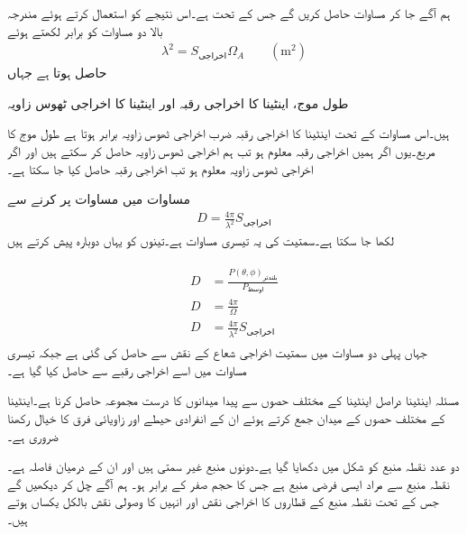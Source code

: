 ہم آگے جا کر مساوات  حاصل کریں گے جس کے تحت   ہے۔اس نتیجے کو استعمال کرتے ہوئے مندرجہ بالا دو مساوات کو برابر لکھتے ہوئے
\begin{align}\label{مساوات_اینٹینا_اخراجی_ٹھوس_زاویہ_اخراجی_رقبہ_تعلق}
\lambda^2 =S_{\text{اخراجی}} \Omega_A \quad \quad (\si{\meter \squared})
\end{align}
حاصل ہوتا ہے جہاں
\begin{description}
 طول موج،
  اینٹینا کا اخراجی رقبہ اور
 اینٹینا کا اخراجی ٹھوس زاویہ
\end{description}
ہیں۔اس مساوات کے تحت اینٹینا کا اخراجی رقبہ ضرب اخراجی ٹھوس زاویہ برابر ہوتا ہے  طول موج کا مربع۔یوں اگر ہمیں اخراجی رقبہ معلوم ہو تب ہم اخراجی ٹھوس زاویہ حاصل کر سکتے ہیں اور اگر اخراجی ٹھوس زاویہ معلوم ہو تب اخراجی رقبہ حاصل کیا جا سکتا ہے۔

مساوات  میں مساوات  پر کرنے سے
\begin{align}
D=\frac{4\pi}{\lambda^2} S_{\text{اخراجی}}
\end{align}
لکھا جا سکتا ہے۔سمتیت کی یہ تیسری مساوات ہے۔تینوں کو یہاں دوبارہ پیش کرتے ہیں

\begin{gather}
\begin{aligned}\label{مساوات_اینٹینا_سمتیت_مختلف_تعارف}
D&=\frac{P(\theta,\phi)_{\text{بلندتر}}}{P_{\text{اوسط}}} \\
D&=\frac{4\pi}{\Omega} \\
D&=\frac{4\pi}{\lambda^2} S_{\text{اخراجی}}
\end{aligned}
\end{gather}
جہاں پہلی دو مساوات میں سمتیت اخراجی شعاع کے نقش سے حاصل کی گئی ہے جبکہ تیسری مساوات میں اسے اخراجی رقبے سے حاصل کیا گیا ہے۔

مسئلہ اینٹینا دراصل اینٹینا کے مختلف حصوں سے پیدا میدانوں کا درست مجموعہ حاصل کرنا ہے۔اینٹینا کے مختلف حصوں کے میدان جمع کرتے ہوئے ان کے انفرادی حیطے اور زاویائی فرق کا خیال رکھنا ضروری ہے۔

 دو عدد نقطہ منبع کو شکل میں دکھایا گیا ہے۔دونوں منبع غیر سمتی ہیں اور ان کے درمیان فاصلہ  ہے۔نقطہ منبع سے مراد ایسی فرضی منبع ہے جس کا حجم صفر کے برابر ہو۔ ہم آگے چل کر  دیکھیں گے جس کے تحت نقطہ منبع کے قطاروں کا اخراجی نقش اور انہیں کا وصولی نقش بالکل یکساں ہوتے ہیں۔    

